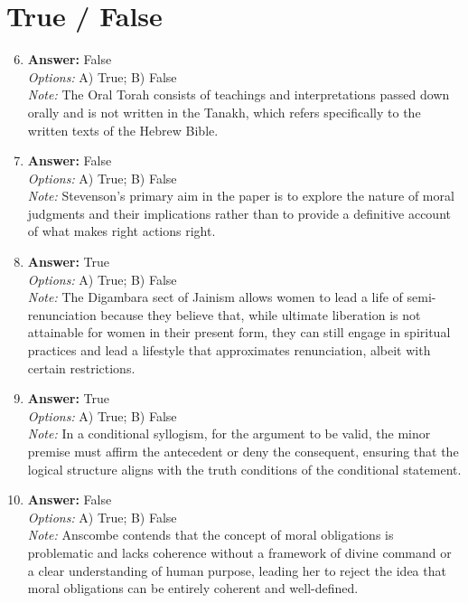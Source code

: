 \documentclass[12pt]{article}
\begin{document}
\section*{True / False}
\begin{enumerate}[label=\arabic*.]
\setcounter{enumi}{5}
\item \textbf{Answer:} False
\\ \textit{Options:} A) True; B) False
\\ \textit{Note:} The Oral Torah consists of teachings and interpretations passed down orally and is not written in the Tanakh, which refers specifically to the written texts of the Hebrew Bible.
\item \textbf{Answer:} False
\\ \textit{Options:} A) True; B) False
\\ \textit{Note:} Stevenson's primary aim in the paper is to explore the nature of moral judgments and their implications rather than to provide a definitive account of what makes right actions right.
\item \textbf{Answer:} True
\\ \textit{Options:} A) True; B) False
\\ \textit{Note:} The Digambara sect of Jainism allows women to lead a life of semi-renunciation because they believe that, while ultimate liberation is not attainable for women in their present form, they can still engage in spiritual practices and lead a lifestyle that approximates renunciation, albeit with certain restrictions.
\item \textbf{Answer:} True
\\ \textit{Options:} A) True; B) False
\\ \textit{Note:} In a conditional syllogism, for the argument to be valid, the minor premise must affirm the antecedent or deny the consequent, ensuring that the logical structure aligns with the truth conditions of the conditional statement.
\item \textbf{Answer:} False
\\ \textit{Options:} A) True; B) False
\\ \textit{Note:} Anscombe contends that the concept of moral obligations is problematic and lacks coherence without a framework of divine command or a clear understanding of human purpose, leading her to reject the idea that moral obligations can be entirely coherent and well-defined.
\end{enumerate}
\end{document}
